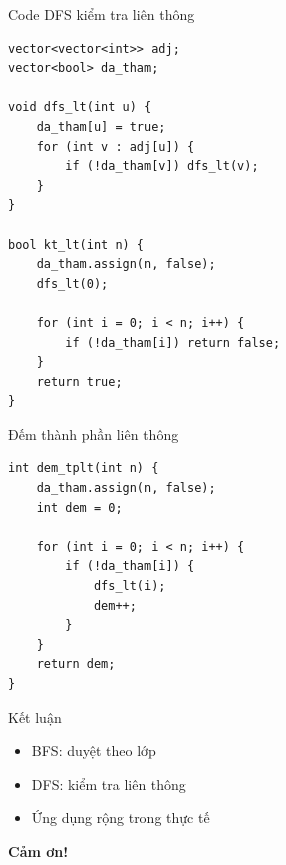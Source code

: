 \documentclass{beamer}
\begin{document}
\begin{frame}[fragile]{Code DFS kiểm tra liên thông}
\begin{tcolorbox}
\begin{lstlisting}
vector<vector<int>> adj;
vector<bool> da_tham;

void dfs_lt(int u) {
    da_tham[u] = true;
    for (int v : adj[u]) {
        if (!da_tham[v]) dfs_lt(v);
    }
}

bool kt_lt(int n) {
    da_tham.assign(n, false);
    dfs_lt(0);

    for (int i = 0; i < n; i++) {
        if (!da_tham[i]) return false;
    }
    return true;
}
\end{lstlisting}
\end{tcolorbox}
\end{frame}

\begin{frame}[fragile]{Đếm thành phần liên thông}
\begin{tcolorbox}
\begin{lstlisting}
int dem_tplt(int n) {
    da_tham.assign(n, false);
    int dem = 0;

    for (int i = 0; i < n; i++) {
        if (!da_tham[i]) {
            dfs_lt(i);
            dem++;
        }
    }
    return dem;
}
\end{lstlisting}
\end{tcolorbox}
\end{frame}

\begin{frame}{Kết luận}
\begin{tcolorbox}
\begin{itemize}
\item \faStream BFS: duyệt theo lớp
\item \faProjectDiagram DFS: kiểm tra liên thông
\item \faRocket Ứng dụng rộng trong thực tế
\end{itemize}
\end{tcolorbox}

\centering
\Huge{\textbf{Cảm ơn!}}
\end{frame}
\end{document}

